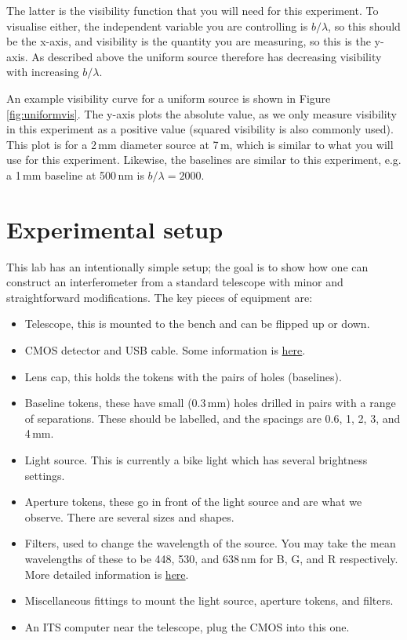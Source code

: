 \documentclass[11pt]{article}
\begin{document}
The latter is the visibility function that you will need for this experiment. To visualise either, the independent variable you are controlling is $b/\lambda$, so this should be the x-axis, and visibility is the quantity you are measuring, so this is the y-axis. As described above the uniform source therefore has decreasing visibility with increasing $b/\lambda$.

An example visibility curve for a uniform source is shown in Figure \ref{fig:uniformvis}. The y-axis plots the absolute value, as we only measure visibility in this experiment as a positive value (squared visibility is also commonly used). This plot is for a 2\,mm diameter source at 7\,m, which is similar to what you will use for this experiment. Likewise, the baselines are similar to this experiment, e.g. a 1\,mm baseline at 500\,nm is $b/\lambda=2000$.

\clearpage
\section{Experimental setup}

This lab has an intentionally simple setup; the goal is to show how one can construct an interferometer from a standard telescope with minor and straightforward modifications. The key pieces of equipment are:
\begin{itemize}
    \item Telescope, this is mounted to the bench and can be flipped up or down.
    \item CMOS detector and USB cable. Some information is \href{https://www.qhyccd.com/qhy5l-ii-planetary-guiding-camera/}{here}.
    \item Lens cap, this holds the tokens with the pairs of holes (baselines).
    \item Baseline tokens, these have small (0.3\,mm) holes drilled in pairs with a range of separations. These should be labelled, and the spacings are 0.6, 1, 2, 3, and 4\,mm.
    \item Light source. This is currently a bike light which has several brightness settings.
    \item Aperture tokens, these go in front of the light source and are what we observe. There are several sizes and shapes.
    \item Filters, used to change the wavelength of the source. You may take the mean wavelengths of these to be 448, 530, and 638\,nm for B, G, and R respectively. More detailed information is \href{https://www.firstlightoptics.com/rgb-filters-filter-sets/zwo-2-lrgb-filter-set.html}{here}.
    \item Miscellaneous fittings to mount the light source, aperture tokens, and filters.
    \item An ITS computer near the telescope, plug the CMOS into this one.
\end{itemize}
\end{document}
